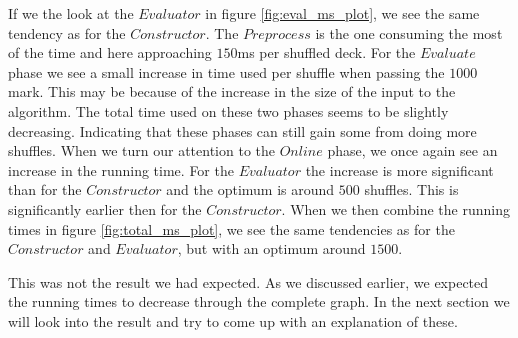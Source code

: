 \documentclass[twoside,11pt,openright]{report}
\begin{document}
If we the look at the $Evaluator$ in figure \ref{fig:eval_ms_plot}, we see the same tendency as for the $Constructor$. The $Preprocess$ is the one consuming the most of the time and here approaching $150$ms per shuffled deck. For the $Evaluate$ phase we see a small increase in time used per shuffle when passing the $1000$ mark. This may be because of the increase in the size of the input to the algorithm. The total time used on these two phases seems to be slightly decreasing. Indicating that these phases can still gain some from doing more shuffles. When we turn our attention to the $Online$ phase, we once again see an increase in the running time. For the $Evaluator$ the increase is more significant than for the $Constructor$ and the optimum is around $500$ shuffles. This is significantly earlier then for the $Constructor$. When we then combine the running times in figure \ref{fig:total_ms_plot}, we see the same tendencies as for the $Constructor$ and $Evaluator$, but with an optimum around $1500$.

\bigskip

This was not the result we had expected. As we discussed earlier, we expected the running times to decrease through the complete graph. In the next section we will look into the result and try to come up with an explanation of these.

\bigskip
\end{document}
